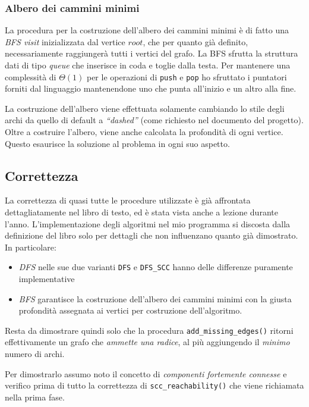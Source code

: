 \documentclass[a4paper,8pt]{article}
\theoremstyle{definition}
\theoremstyle{remark}
\begin{document}
\subsubsection{Albero dei cammini minimi}
La procedura per la costruzione dell'albero dei cammini minimi è di fatto una
\emph{BFS visit} inizializzata dal vertice $root$, che per quanto già definito, necessariamente
raggiungerà tutti i vertici del grafo. La BFS sfrutta la struttura dati di tipo \emph{queue}
che inserisce in coda e toglie dalla testa. Per mantenere una complessità di $\Theta(1)$
per le operazioni di \texttt{push} e \texttt{pop} ho sfruttato i puntatori forniti dal
linguaggio mantenendone uno che punta all'inizio e un altro alla fine.

La costruzione dell'albero viene effettuata solamente cambiando lo stile degli archi
da quello di default a \textit{``dashed''} (come richiesto nel documento del progetto).
Oltre a costruire l'albero, viene anche calcolata la profondità di ogni vertice.
Questo esaurisce la soluzione al problema in ogni suo aspetto.

\subsection{Correttezza}
La correttezza di quasi tutte le procedure utilizzate è già affrontata dettagliatamente
nel libro di testo, ed è stata vista anche a lezione durante l'anno. L'implementazione
degli algoritmi nel mio programma si discosta dalla definizione del libro solo per
dettagli che non influenzano quanto già dimostrato. In particolare:

\begin{itemize}
  \item \emph{DFS} nelle sue due varianti \texttt{DFS} e \texttt{DFS\_SCC} hanno
    delle differenze puramente implementative
  \item \emph{BFS} garantisce la costruzione dell'albero dei cammini minimi con
    la giusta profondità assegnata ai vertici per costruzione dell'algoritmo.
\end{itemize}

Resta da dimostrare quindi solo che la procedura \verb!add_missing_edges()! ritorni
effettivamente un grafo che \emph{ammette una radice}, al più aggiungendo il \emph{minimo}
numero di archi.

Per dimostrarlo assumo noto il concetto di \emph{componenti fortemente connesse}
e verifico prima di tutto la correttezza di \verb!scc_reachability()! che viene
richiamata nella prima fase.
\end{document}
